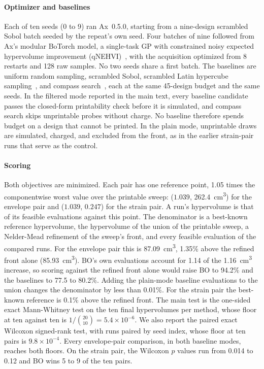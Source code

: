 \documentclass[11pt]{article}
\begin{document}
\paragraph{Optimizer and baselines} Each of ten seeds (0 to 9) ran
Ax~0.5.0, starting from a nine-design scrambled Sobol batch seeded by
the repeat's own seed. Four batches of nine followed from Ax's modular
BoTorch model, a single-task GP with constrained noisy expected
hypervolume improvement (qNEHVI)~\cite{daulton2021nehvi}, with the
acquisition optimized from 8 restarts and 128 raw samples. No two seeds share a
first batch. The baselines are uniform random sampling, scrambled
Sobol, scrambled Latin hypercube sampling~\cite{mckay1979lhs}, and
compass search~\cite{kolda2003directsearch}, each at the same 45-design
budget and the same seeds. In the filtered mode reported in the main
text, every baseline candidate passes the closed-form printability
check before it is simulated, and compass search skips unprintable
probes without charge. No baseline therefore spends budget on a design
that cannot be printed. In the plain mode, unprintable draws are simulated,
charged, and excluded from the front, as in the earlier strain-pair
runs that serve as the control.

\paragraph{Scoring} Both objectives are minimized. Each pair has one
reference point, 1.05 times the componentwise worst value over the
printable sweep: ($1.039$, \SI{262.4}{cm^3}) for the envelope pair and
($1.039$, $0.247$) for the strain pair. A run's hypervolume is that of
its feasible evaluations against this point. The denominator is a
best-known reference hypervolume, the hypervolume of the union of the
printable sweep, a Nelder-Mead refinement of the sweep's front, and
every feasible evaluation of the compared runs. For the envelope pair
this is \SI{87.09}{cm^3}, 1.35\% above the refined front alone
(\SI{85.93}{cm^3}). BO's own evaluations account for 1.14 of the
1.16~\si{cm^3} increase, so scoring against the refined front alone
would raise BO to 94.2\% and the baselines to 77.5 to 80.2\%. Adding
the plain-mode baseline evaluations to the union changes the
denominator by less than 0.01\%. For the strain pair the best-known
reference is 0.1\% above the refined front. The main test is the
one-sided exact Mann-Whitney test on the ten final hypervolumes per
method, whose floor at ten against ten is
$1/\binom{20}{10} = 5.4\times10^{-6}$. We also report the paired exact
Wilcoxon signed-rank test, with runs paired by seed index, whose floor
at ten pairs is $9.8\times10^{-4}$. Every
envelope-pair comparison, in both baseline modes, reaches both floors.
On the strain pair, the Wilcoxon $p$ values run from 0.014 to 0.12 and
BO wins 5 to 9 of the ten pairs.
\end{document}
